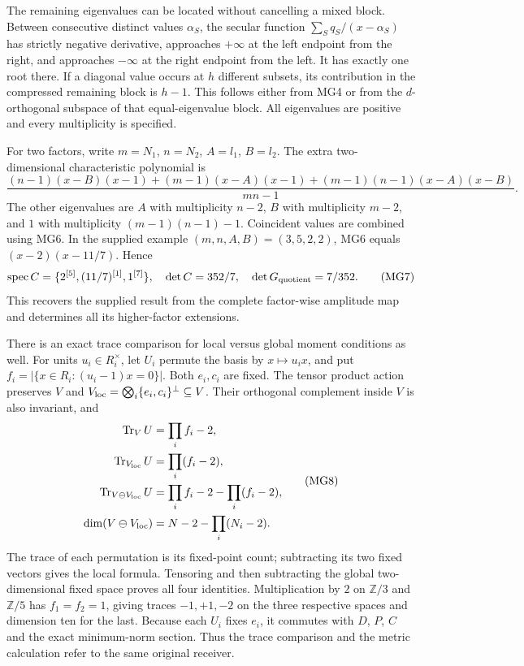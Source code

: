 \documentclass[11pt,a4paper]{article}
\theoremstyle{definition}\newtheorem{definition}[theorem]{Definition}
\newcommand{\Z}{\mathbb Z}\newcommand{\Q}{\mathbb Q}
\begin{document}
The remaining eigenvalues can be located without cancelling a
mixed block. Between consecutive distinct values $\alpha_S$, the
secular function $\sum_Sq_S/(x-\alpha_S)$ has strictly negative
derivative, approaches $+\infty$ at the left endpoint from the
right, and approaches $-\infty$ at the right endpoint from the
left. It has exactly one root there. If a diagonal value occurs
at $h$ different subsets, its contribution in the compressed
remaining block is $h-1$. This follows either from MG4 or from
the $d$-orthogonal subspace of that equal-eigenvalue block.
All eigenvalues are positive and every multiplicity is specified.

For two factors, write $m=N_1$, $n=N_2$, $A=l_1$, $B=l_2$.
The extra two-dimensional characteristic polynomial is
\[
 \frac{(n-1)(x-B)(x-1)+(m-1)(x-A)(x-1)
 +(m-1)(n-1)(x-A)(x-B)}{mn-1}.
 \tag{MG6}\label{mg:two-factor}
\]
The other eigenvalues are $A$ with multiplicity $n-2$, $B$ with
multiplicity $m-2$, and $1$ with multiplicity
$(m-1)(n-1)-1$. Coincident values are combined using MG6.
In the supplied example $(m,n,A,B)=(3,5,2,2)$, MG6 equals
$(x-2)(x-11/7)$. Hence
\[
 \operatorname{spec}C=\{2^{[5]},(11/7)^{[1]},1^{[7]}\},
 \quad \det C=352/7,\quad\det G_{\rm quotient}=7/352.
 \tag{MG7}\label{mg:example}
\]
This recovers the supplied result from the complete factor-wise
amplitude map and determines all its higher-factor extensions.

There is an exact trace comparison for local versus global moment
conditions as well. For units $u_i\in R_i^\times$, let $U_i$
permute the basis by $x\mapsto u_ix$, and put
$f_i=|\{x\in R_i:(u_i-1)x=0\}|$. Both $e_i,c_i$ are fixed.
The tensor product action preserves $V$ and
$V_{\rm loc}=\bigotimes_i\{e_i,c_i\}^\perp\subseteq V$.
Their orthogonal complement inside $V$ is also invariant, and
\[
 \begin{aligned}
 \operatorname{Tr}_V U&=\prod_i f_i-2,\\
 \operatorname{Tr}_{V_{\rm loc}}U&=\prod_i(f_i-2),\\
 \operatorname{Tr}_{V\ominus V_{\rm loc}}U
 &=\prod_i f_i-2-\prod_i(f_i-2),\\
 \dim(V\ominus V_{\rm loc})&=N-2-\prod_i(N_i-2).
 \end{aligned}
 \tag{MG8}\label{mg:trace}
\]
The trace of each permutation is its fixed-point count; subtracting
its two fixed vectors gives the local formula. Tensoring and then
subtracting the global two-dimensional fixed space proves all four
identities. Multiplication by $2$ on $\Z/3$ and $\Z/5$ has
$f_1=f_2=1$, giving traces $-1,+1,-2$ on the three respective
spaces and dimension ten for the last. Because each $U_i$ fixes
$e_i$, it commutes with $D$, $P$, $C$ and the exact minimum-norm
section. Thus the trace comparison and the metric calculation
refer to the same original receiver.
\end{document}
